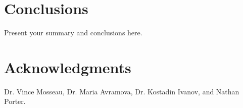 \documentclass{mc2015}
\begin{document}
\section{Conclusions}

Present your summary and conclusions here.

\clearpage
\section{Acknowledgments}

Dr. Vince Mosseau, Dr. Maria Avramova, Dr. Kostadin Ivanov, and Nathan Porter.

\setlength{\baselineskip}{12pt}





\end{document}
